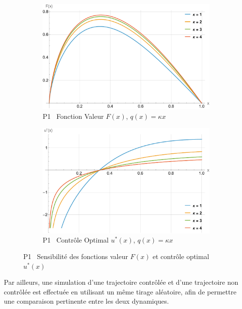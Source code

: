 \begin{figure}[htb]
    \begin{subfigure}{0.49\linewidth}
        \includegraphics[width=\linewidth]{img/validation/P1/p1_K_value.pdf}
        \caption{P1 \textemdash~Fonction Valeur $F(x)$, $q(x)=\kappa x$}\label{fig:KappaValueVisualisation1}
    \end{subfigure}
    \hfill
    \begin{subfigure}{0.49\linewidth}
        \includegraphics[width=\linewidth]{img/validation/P1/p1_K_control.pdf}
        \caption{P1 \textemdash~Contrôle Optimal $u^*(x)$, $q(x)=\kappa x$}\label{fig:KappaControlVisualisation1}
    \end{subfigure}

    \caption{P1 \textemdash~Sensibilité des fonctions valeur $F(x)$ et contrôle optimal $u^*(x)$}
    \label{fig:ParamSensitivityP1}
\end{figure}
\FloatBarrier Par ailleurs, une simulation d'une trajectoire contrôlée et d'une trajectoire non contrôlée est effectuée en utilisant un même tirage aléatoire, afin de permettre une comparaison pertinente entre les deux dynamiques.
